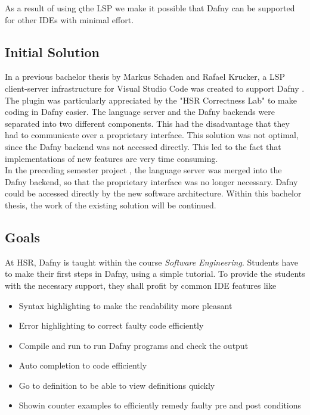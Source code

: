 As a result of using çthe LSP we make it possible that Dafny can be supported for other IDEs with minimal effort.

\subsection{Initial Solution}
\label{section:management_summary:initialsolution}
In a previous bachelor thesis by Markus Schaden and Rafael Krucker, a LSP client-server infrastructure for Visual Studio Code was created to support Dafny \cite{ba}.
The plugin was particularly appreciated by the "HSR Correctness Lab" \cite{correctnessLab} to make coding in Dafny easier.
The language server and the Dafny backends were separated into two different components.
This had the disadvantage that they had to communicate over a proprietary interface.
This solution was not optimal, since the Dafny backend was not accessed directly.
This led to the fact that implementations of new features are very time consuming. \\

In the preceding semester project \cite{sa}, the language server was merged into the Dafny backend, so that the proprietary interface was no longer necessary.
Dafny could be accessed directly by the new software architecture.
Within this bachelor thesis, the work of the existing solution will be continued.

\subsection{Goals}
At HSR, Dafny is taught within the course \textit{Software Engineering}.
Students have to make their first steps in Dafny, using a simple tutorial.
To provide the students with the necessary support, they shall profit by common IDE features like
\begin{itemize}
    \item Syntax highlighting to make the readability more pleasant
    \item Error highlighting to correct faulty code efficiently
    \item Compile and run to run Dafny programs and check the output
    \item Auto completion to code efficiently
    \item Go to definition to be able to view definitions quickly
    \item Showin counter examples to efficiently remedy faulty pre and post conditions
\end{itemize}

